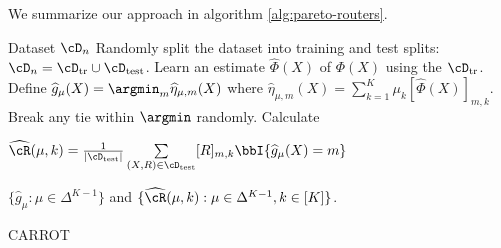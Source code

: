 We summarize our approach in algorithm \ref{alg:pareto-routers}. 
\begin{algorithm}
    \begin{algorithmic}[1]
\REQUIRE Dataset $\cD_n$
\STATE Randomly split the dataset into training and test splits: $\cD_n = \cD_{\text{tr}} \cup \cD_{\text{test}}$. 
\STATE  Learn an estimate $\hat \Phi (X)$ of $\Phi(X)$ using the $\cD_{\text{tr}}$. 
\STATE  Define $\widehat g_\mu(X) = \argmin_m \widehat \eta_{\mu, m}(X)$ where $\widehat \eta_{\mu, m}(X) =  \sum_{k = 1}^K \mu_k [\widehat \Phi (X)]_{m, k}   $. Break any tie within $\argmin$ randomly.
 \STATE Calculate 
 
 $\widehat \cR(\mu, k)  =  \frac1{|\cD_{\text{test}}|} \sum\limits_{(X, R) \in \cD_{\text{test}}}  [R]_{m, k} \bbI\{ \widehat g_\mu(X) = m\} $
\ENDFOR

 $\{\widehat g_\mu: \mu \in \Delta^{K-1}\}$ and $ \{\widehat \cR(\mu, k): \mu \in \Delta^{K-1}, k\in [K]\}$. 
\end{algorithmic}
\caption{CARROT}
\label{alg:pareto-routers}
\end{algorithm}


